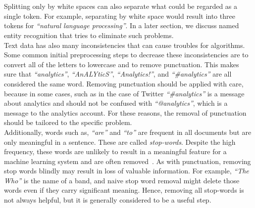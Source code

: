      \\
\\
Splitting only by white spaces can also separate what could be regarded as a single token. For example, separating by white space would result into three tokens for \emph{``natural language processing''}. In a later section, we discuss named entity recognition that tries to eliminate such problems. \\
Text data has also many inconsistencies that can cause troubles for algorithms. Some common initial preprocessing steps to decrease these inconsistencies are to convert all of the letters to lowercase and to remove punctuation.
This makes sure that \emph{``analytics''}, \emph{``AnALYticS''}, \emph{``Analytics!''}, and \emph{``\#analytics''} are all considered the same word. Removing punctuation should be applied with care, because in some cases, such as in the case of Twitter \emph{``\#analytics''} is a message about analytics and should not be confused with \emph{``@analytics''}, which is a message to the analytics account. For these reasons, the removal of punctuation should be tailored to the specific problem.\\
Additionally, words such as, \emph{``are''} and \emph{``to''} are frequent in all documents but are only meaningful in a sentence. These are called \emph{stop-words}. Despite the high frequency, these words are unlikely to result in a meaningful feature for a machine learning system and are often removed~. As with punctuation, removing stop words blindly may result in loss of valuable information. For example, \emph{``The Who''} is the name of a band, and naive stop word removal might delete those words even if they carry significant meaning. Hence, removing all stop-words is not always helpful, but it is generally considered to be a useful step. 
